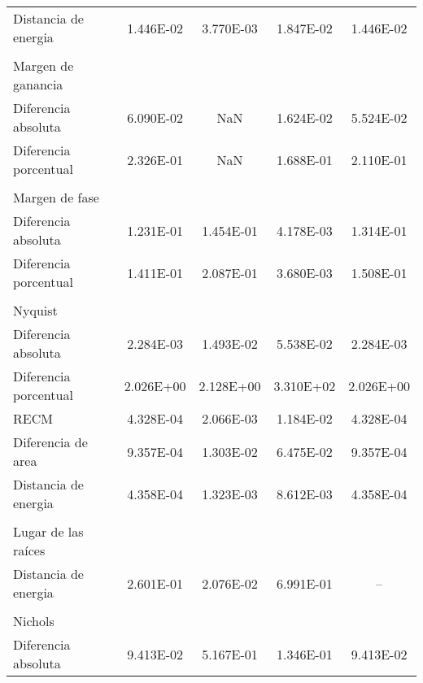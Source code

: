 {\begin{longtable}{l @{\extracolsep{\fill}} cccc}
            Distancia de energia         & \num{1.446E-02} & \num{3.770E-03} & \num{1.847E-02} & \num{1.446E-02}  \\
            & & & &\\
            Margen de ganancia & & & & \\ \cmidrule{1-1}
            Diferencia absoluta          & \num{6.090E-02} & NaN & \num{1.624E-02} & \num{5.524E-02}  \\
            Diferencia porcentual        & \num{2.326E-01} & NaN & \num{1.688E-01} & \num{2.110E-01}  \\
            & & & &\\
            Margen de fase & & & & \\ \cmidrule{1-1}
            Diferencia absoluta          & \num{1.231E-01} & \num{1.454E-01} & \num{4.178E-03} & \num{1.314E-01}  \\
            Diferencia porcentual        & \num{1.411E-01} & \num{2.087E-01} & \num{3.680E-03} & \num{1.508E-01}  \\
            & & & &\\
            Nyquist & & & &\\ \cmidrule{1-1}
            Diferencia absoluta          & \num{2.284E-03} & \num{1.493E-02} & \num{5.538E-02} & \num{2.284E-03}  \\
            Diferencia porcentual        & \num{2.026E+00} & \num{2.128E+00} & \num{3.310E+02} & \num{2.026E+00}  \\
            RECM                         & \num{4.328E-04} & \num{2.066E-03} & \num{1.184E-02} & \num{4.328E-04}  \\
            Diferencia de area           & \num{9.357E-04} & \num{1.303E-02} & \num{6.475E-02} & \num{9.357E-04}  \\
            Distancia de energia         & \num{4.358E-04} & \num{1.323E-03} & \num{8.612E-03} & \num{4.358E-04}  \\
            & & & &\\
            Lugar de las raíces & & & & \\ \cmidrule{1-1}
            Distancia de energia         & \num{2.601E-01} & \num{2.076E-02} & \num{6.991E-01} & --  \\
            & & & &\\
            Nichols & & & & \\ \cmidrule{1-1}
            Diferencia absoluta          & \num{9.413E-02} & \num{5.167E-01} & \num{1.346E-01} & \num{9.413E-02}  \\

\end{longtable}}
